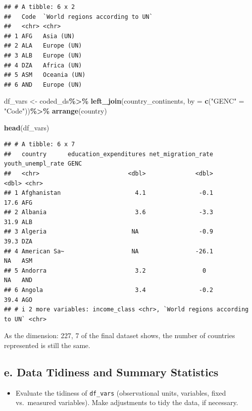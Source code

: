 \documentclass[
]{article}
\newenvironment{Shaded}{\begin{snugshade}}{\end{snugshade}}
\newcommand{\AttributeTok}[1]{\textcolor[rgb]{0.13,0.29,0.53}{#1}}
\newcommand{\FunctionTok}[1]{\textcolor[rgb]{0.13,0.29,0.53}{\textbf{#1}}}
\newcommand{\NormalTok}[1]{#1}
\newcommand{\OtherTok}[1]{\textcolor[rgb]{0.56,0.35,0.01}{#1}}
\newcommand{\SpecialCharTok}[1]{\textcolor[rgb]{0.81,0.36,0.00}{\textbf{#1}}}
\newcommand{\StringTok}[1]{\textcolor[rgb]{0.31,0.60,0.02}{#1}}
\providecommand{\tightlist}{%
  \setlength{\itemsep}{0pt}\setlength{\parskip}{0pt}}
\begin{document}
\begin{verbatim}
## # A tibble: 6 x 2
##   Code  `World regions according to UN`
##   <chr> <chr>                          
## 1 AFG   Asia (UN)                      
## 2 ALA   Europe (UN)                    
## 3 ALB   Europe (UN)                    
## 4 DZA   Africa (UN)                    
## 5 ASM   Oceania (UN)                   
## 6 AND   Europe (UN)
\end{verbatim}

\begin{Shaded}
\begin{Highlighting}[]
\NormalTok{df\_vars }\OtherTok{\textless{}{-}}\NormalTok{ coded\_ds}\SpecialCharTok{\%\textgreater{}\%}
  \FunctionTok{left\_join}\NormalTok{(country\_continents, }\AttributeTok{by =} \FunctionTok{c}\NormalTok{(}\StringTok{"GENC"} \OtherTok{=} \StringTok{"Code"}\NormalTok{))}\SpecialCharTok{\%\textgreater{}\%}
  \FunctionTok{arrange}\NormalTok{(country)}

\FunctionTok{head}\NormalTok{(df\_vars)}
\end{Highlighting}
\end{Shaded}

\begin{verbatim}
## # A tibble: 6 x 7
##   country      education_expenditures net_migration_rate youth_unempl_rate GENC 
##   <chr>                         <dbl>              <dbl>             <dbl> <chr>
## 1 Afghanistan                     4.1               -0.1              17.6 AFG  
## 2 Albania                         3.6               -3.3              31.9 ALB  
## 3 Algeria                        NA                 -0.9              39.3 DZA  
## 4 American Sa~                   NA                -26.1              NA   ASM  
## 5 Andorra                         3.2                0                NA   AND  
## 6 Angola                          3.4               -0.2              39.4 AGO  
## # i 2 more variables: income_class <chr>, `World regions according to UN` <chr>
\end{verbatim}

As the dimension: 227, 7 of the final dataset shows, the number of
countries represented is still the same.

\subsection{e. Data Tidiness and Summary
Statistics}\label{e.-data-tidiness-and-summary-statistics}

\begin{itemize}
\tightlist
\item
  Evaluate the tidiness of \texttt{df\_vars} (observational units,
  variables, fixed vs.~measured variables). Make adjustments to tidy the
  data, if necessary.
\end{itemize}
\end{document}
